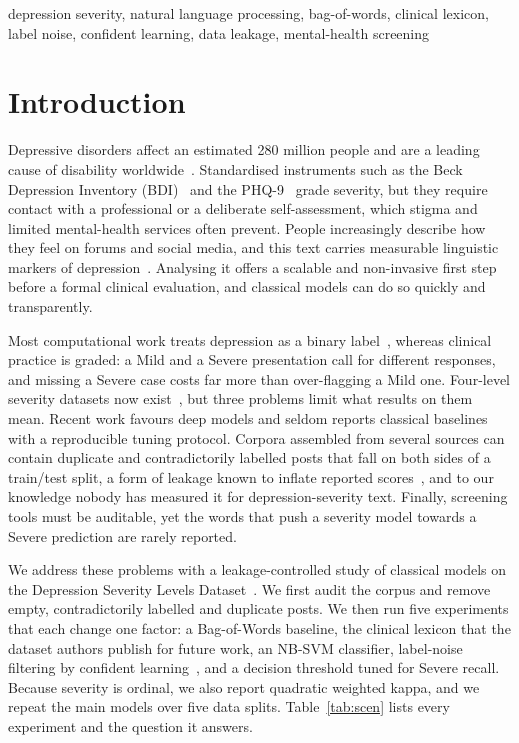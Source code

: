 \documentclass[conference]{IEEEtran}
\begin{document}
\begin{IEEEkeywords}
depression severity, natural language processing, bag-of-words, clinical lexicon, label noise, confident learning, data leakage, mental-health screening
\end{IEEEkeywords}

\section{Introduction}

Depressive disorders affect an estimated 280 million people and are a leading cause of disability worldwide~\cite{who2023depression}. Standardised instruments such as the Beck Depression Inventory (BDI)~\cite{beck1996bdi2,beck1988psychometric} and the PHQ-9~\cite{kroenke2001phq9} grade severity, but they require contact with a professional or a deliberate self-assessment, which stigma and limited mental-health services often prevent. People increasingly describe how they feel on forums and social media, and this text carries measurable linguistic markers of depression~\cite{rude2004language,dechoudhury2013predicting}. Analysing it offers a scalable and non-invasive first step before a formal clinical evaluation, and classical models can do so quickly and transparently.

Most computational work treats depression as a binary label~\cite{dechoudhury2013predicting,coppersmith2014quantifying}, whereas clinical practice is graded: a Mild and a Severe presentation call for different responses, and missing a Severe case costs far more than over-flagging a Mild one. Four-level severity datasets now exist~\cite{naseem2022early,sampath2022dataset,kuas2023dataset}, but three problems limit what results on them mean. Recent work favours deep models and seldom reports classical baselines with a reproducible tuning protocol. Corpora assembled from several sources can contain duplicate and contradictorily labelled posts that fall on both sides of a train/test split, a form of leakage known to inflate reported scores~\cite{kapoor2023leakage,lee2022dedup}, and to our knowledge nobody has measured it for depression-severity text. Finally, screening tools must be auditable, yet the words that push a severity model towards a Severe prediction are rarely reported.

We address these problems with a leakage-controlled study of classical models on the Depression Severity Levels Dataset~\cite{kuas2023dataset}. We first audit the corpus and remove empty, contradictorily labelled and duplicate posts. We then run five experiments that each change one factor: a Bag-of-Words baseline, the clinical lexicon that the dataset authors publish for future work, an NB-SVM classifier, label-noise filtering by confident learning~\cite{northcutt2021confident}, and a decision threshold tuned for Severe recall. Because severity is ordinal, we also report quadratic weighted kappa, and we repeat the main models over five data splits. Table~\ref{tab:scen} lists every experiment and the question it answers.
\end{document}
